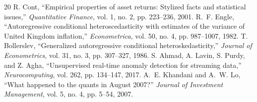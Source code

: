 \documentclass[pdflatex,sn-mathphys-num]{sn-jnl}
\begin{document}
\begin{thebibliography}{20}
 R. Cont, ``Empirical properties of asset returns: Stylized facts and statistical issues,'' \emph{Quantitative Finance}, vol. 1, no. 2, pp. 223--236, 2001.
 R.~F. Engle, ``Autoregressive conditional heteroscedasticity with estimates of the variance of United Kingdom inflation,'' \emph{Econometrica}, vol. 50, no. 4, pp. 987--1007, 1982.
 T. Bollerslev, ``Generalized autoregressive conditional heteroskedasticity,'' \emph{Journal of Econometrics}, vol. 31, no. 3, pp. 307--327, 1986.
 S. Ahmad, A. Lavin, S. Purdy, and Z. Agha, ``Unsupervised real-time anomaly detection for streaming data,'' \emph{Neurocomputing}, vol. 262, pp. 134--147, 2017.
 A.~E. Khandani and A.~W. Lo, ``What happened to the quants in August 2007?'' \emph{Journal of Investment Management}, vol. 5, no. 4, pp. 5--54, 2007.
\end{thebibliography}
\end{document}

